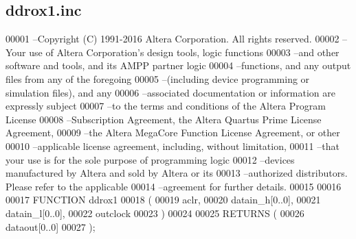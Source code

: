 \subsection{ddrox1.\+inc}
\label{ddrox1_8inc_source}

\begin{DoxyCode}
00001 --Copyright (C) 1991-2016 Altera Corporation. All rights reserved.
00002 --Your use of Altera Corporation\textcolor{stringliteral}{'s design tools, logic functions }
00003 \textcolor{stringliteral}{--and other software and tools, and its AMPP partner logic }
00004 \textcolor{stringliteral}{--functions, and any output files from any of the foregoing }
00005 \textcolor{stringliteral}{--(including device programming or simulation files), and any }
00006 \textcolor{stringliteral}{--associated documentation or information are expressly subject }
00007 \textcolor{stringliteral}{--to the terms and conditions of the Altera Program License }
00008 \textcolor{stringliteral}{--Subscription Agreement, the Altera Quartus Prime License Agreement,}
00009 \textcolor{stringliteral}{--the Altera MegaCore Function License Agreement, or other }
00010 \textcolor{stringliteral}{--applicable license agreement, including, without limitation, }
00011 \textcolor{stringliteral}{--that your use is for the sole purpose of programming logic }
00012 \textcolor{stringliteral}{--devices manufactured by Altera and sold by Altera or its }
00013 \textcolor{stringliteral}{--authorized distributors.  Please refer to the applicable }
00014 \textcolor{stringliteral}{--agreement for further details.}
00015 \textcolor{stringliteral}{}
00016 \textcolor{stringliteral}{}
00017 \textcolor{stringliteral}{FUNCTION ddrox1 }
00018 \textcolor{stringliteral}{(}
00019 \textcolor{stringliteral}{    aclr,}
00020 \textcolor{stringliteral}{    datain\_h[0..0],}
00021 \textcolor{stringliteral}{    datain\_l[0..0],}
00022 \textcolor{stringliteral}{    outclock}
00023 \textcolor{stringliteral}{)}
00024 \textcolor{stringliteral}{}
00025 \textcolor{stringliteral}{RETURNS (}
00026 \textcolor{stringliteral}{    dataout[0..0]}
00027 \textcolor{stringliteral}{);}
\end{DoxyCode}
